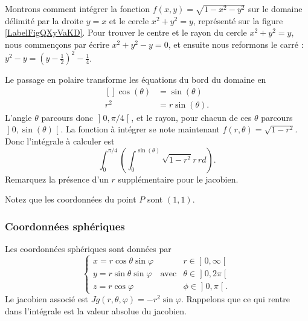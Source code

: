 \begin{example}    
    Montrons comment intégrer la fonction $f(x,y)=\sqrt{1-x^2-y^2}$ sur le domaine délimité par la droite $y=x$ et le cercle $x^2+y^2=y$, représenté sur la figure \ref{LabelFigQXyVaKD}. Pour trouver le centre et le rayon du cercle $x^2+y^2=y$, nous commençons par écrire $x^2+y^2-y=0$, et ensuite nous reformons le carré : $y^2-y=(y-\frac{ 1 }{2})^2-\frac{1}{ 4 }$.
    \newcommand{\CaptionFigQXyVaKD}{Passage en polaire pour intégrer sur un morceau de cercle.}


    Le passage en polaire transforme les équations du bord du domaine en
    \begin{equation}
        \begin{aligned}[]
            \cos(\theta)&=\sin(\theta)\\
            r^2&=r\sin(\theta).
        \end{aligned}
    \end{equation}
    L'angle $\theta$ parcours donc $\mathopen] 0 , \pi/4 \mathclose[$, et le rayon, pour chacun de ces $\theta$ parcours $\mathopen] 0 , \sin(\theta) \mathclose[$. La fonction à intégrer se note maintenant $f(r,\theta)=\sqrt{1-r^2}$. Donc l'intégrale à calculer est
    \begin{equation}		\label{PgRapIntMultFubiniBoutCercle}
        \int_{0}^{\pi/4}\left( \int_0^{\sin(\theta)}\sqrt{1-r^2}r\,rd \right).
    \end{equation}
    Remarquez la présence d'un $r$ supplémentaire pour le jacobien.

    Notez que les coordonnées du point $P$ sont $(1,1)$.
\end{example}

\subsubsection{Coordonnées sphériques}

Les coordonnées sphériques sont données par
\begin{equation}		\label{EqChmVarSpherique}
	\left\{
\begin{array}{lllll}
x=r\cos\theta\sin\varphi	&			&r\in\mathopen] 0 , \infty \mathclose[\\
y=r\sin\theta\sin\varphi	&	\text{avec}	&\theta\in\mathopen] 0 , 2\pi \mathclose[\\
z=r\cos\varphi			&			&\phi\in\mathopen] 0 , \pi \mathclose[.
\end{array}
\right.
\end{equation}
Le jacobien associé est $Jg(r,\theta,\varphi)=-r^2\sin\varphi$. Rappelons que ce qui rentre dans l'intégrale est la valeur absolue du jacobien.

